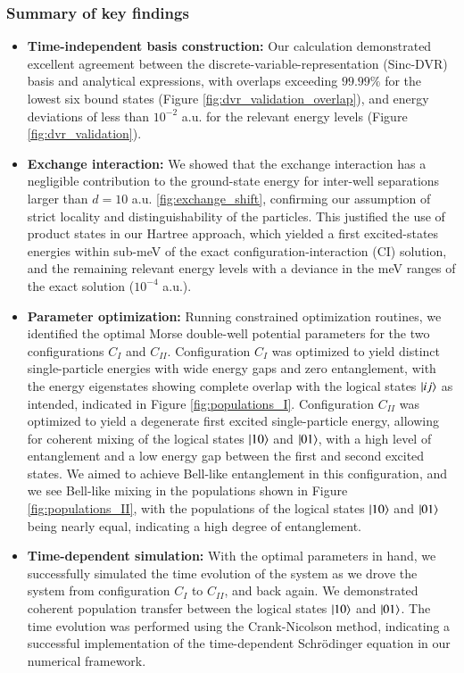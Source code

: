 \documentclass{subfiles}
\begin{document}
\subsubsection*{Summary of key findings}
\begin{itemize}
    \item \textbf{Time-independent basis construction:} Our calculation demonstrated excellent agreement between the discrete-variable-representation (Sinc-DVR) basis and analytical expressions, with overlaps exceeding $99.99\%$ for the lowest six bound states (Figure \ref{fig:dvr_validation_overlap}), and energy deviations of less than $10^{-2}$ a.u. for the relevant energy levels (Figure \ref{fig:dvr_validation}).
    \item \textbf{Exchange interaction:} We showed that the exchange interaction has a negligible contribution to the ground-state energy for inter-well separations larger than $d = 10$ a.u. \ref{fig:exchange_shift}, confirming our assumption of strict locality and distinguishability of the particles. This justified the use of product states in our Hartree approach, which yielded a first excited-states energies within sub-meV of the exact configuration-interaction (CI) solution, and the remaining relevant energy levels with a deviance in the meV ranges of the exact solution ($10^{-4}$ a.u.).
    \item \textbf{Parameter optimization:} Running constrained optimization routines, we identified the optimal Morse double-well potential parameters for the two configurations $C_I$ and $C_{II}$. Configuration $C_I$ was optimized to yield distinct single-particle energies with wide energy gaps and zero entanglement, with the energy eigenstates showing complete overlap with the logical states $\ket{ij}$ as intended, indicated in Figure \ref{fig:populations_I}. Configuration $C_{II}$ was optimized to yield a degenerate first excited single-particle energy, allowing for coherent mixing of the logical states $\ket{10}$ and $\ket{01}$, with a high level of entanglement and a low energy gap between the first and second excited states. We aimed to achieve Bell-like entanglement in this configuration, and we see Bell-like mixing in the populations shown in Figure \ref{fig:populations_II}, with the populations of the logical states $\ket{10}$ and $\ket{01}$ being nearly equal, indicating a high degree of entanglement.
    \item \textbf{Time-dependent simulation:} With the optimal parameters in hand, we successfully simulated the time evolution of the system as we drove the system from configuration $C_I$ to $C_{II}$, and back again. We demonstrated coherent population transfer between the logical states $\ket{10}$ and $\ket{01}$. The time evolution was performed using the Crank-Nicolson method, indicating a successful implementation of the time-dependent Schrödinger equation in our numerical framework. 

\end{itemize}
\end{document}

